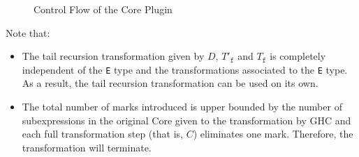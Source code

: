 \documentclass[runningheads, a4paper]{llncs}
\newcommand{\ttt}{\texttt}
\begin{document}
\begin{figure}
  \centering
   \caption{Control Flow of the Core Plugin}
   \label{fig:CorePlugin}
\end{figure}%

\pagebreak
Note that:
\begin{itemize}
  \item The tail recursion transformation given by $D$, $T'_{\ttt{f}}$ and $T_{\ttt{f}}$ is completely independent of the \ttt{E} type and the transformations associated to the \ttt{E} type. As a result, the tail recursion transformation can be used on its own.

  \item The total number of marks introduced is upper bounded by the number of
subexpressions in the original Core given to the transformation by GHC and each
full transformation step (that is, $C$) eliminates one mark. Therefore, the
transformation will terminate.
\end{itemize}
\end{document}
